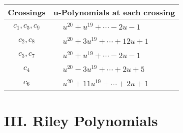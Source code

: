 \documentclass[1p]{elsarticle_modified}
\theoremstyle{definition}
\begin{document}
\begin{tabular}{m{50pt}|m{274pt}}
Crossings & \hspace{64pt}u-Polynomials at each crossing \\
\hline $$\begin{aligned}c_{1},c_{5},c_{9}\end{aligned}$$&$\begin{aligned}
&u^{20}+u^{19}+\cdots-2 u-1
\end{aligned}$\\
\hline $$\begin{aligned}c_{2},c_{8}\end{aligned}$$&$\begin{aligned}
&u^{20}+3 u^{19}+\cdots+12 u+1
\end{aligned}$\\
\hline $$\begin{aligned}c_{3},c_{7}\end{aligned}$$&$\begin{aligned}
&u^{20}+u^{19}+\cdots-2 u-1
\end{aligned}$\\
\hline $$\begin{aligned}c_{4}\end{aligned}$$&$\begin{aligned}
&u^{20}-3 u^{19}+\cdots+2 u+5
\end{aligned}$\\
\hline $$\begin{aligned}c_{6}\end{aligned}$$&$\begin{aligned}
&u^{20}+11 u^{19}+\cdots+2 u+1
\end{aligned}$\\
\hline
\end{tabular}\newpage\renewcommand{\arraystretch}{1}
\centering \section*{ III. Riley Polynomials}
\end{document}
